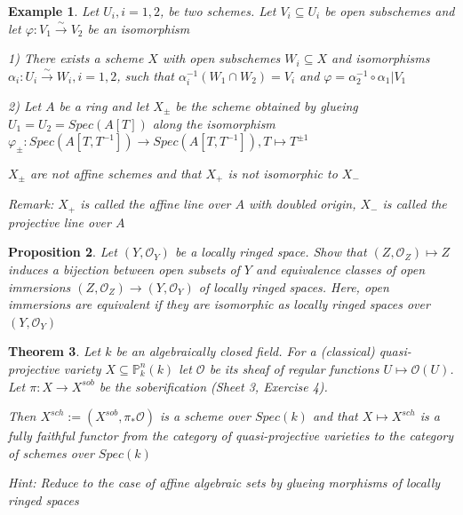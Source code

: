 \documentclass{article}
\newtheorem{theorem}{Theorem}[section]
\newtheorem{example}[theorem]{Example}
\newtheorem{proposition}[theorem]{Proposition}
\begin{document}
\begin{example}
Let $U_i, i = 1, 2$, be two schemes. Let $V_i \subseteq U_i$ be open subschemes and let $\varphi: V_1
\xrightarrow{\sim} V_2$ be an
isomorphism

1) There exists a scheme $X$ with open subschemes $W_i \subseteq X$ and isomorphisms $\alpha_i: U_i\xrightarrow{\sim}W_i, i = 1, 2$, such that $\alpha_i^{-1}(W_1 \cap W_2)= V_i$ and $\varphi = \alpha_2^{-1}\circ \alpha_1|V_1$

2) Let $A$ be a ring and let $X_{\pm}$ be the scheme obtained by glueing $U_1 = U_2 = Spec(A[T])$ along the
isomorphism $\varphi_{\pm} : Spec(A[T, T^{-1}]) \to Spec(A[T, T^{-1}]), T\mapsto T^{\pm 1}$ 

$X_\pm$ are not affine
schemes and that $X_+$ is not isomorphic to $X_-$

Remark: $X_+$ is called the affine line over $A$ with doubled origin, $X_-$ is called the projective line
over $A$
\end{example}
\begin{proposition}
Let $(Y, \mathcal O_Y )$ be a locally ringed space. Show that $(Z, \mathcal O_Z) \mapsto Z$ induces a bijection between
open subsets of $Y$ and equivalence classes of open immersions $(Z, \mathcal O_Z) \to (Y, \mathcal O_Y)$ of locally ringed
spaces. Here, open immersions are equivalent if they are isomorphic as locally ringed spaces over
$(Y, \mathcal O_Y )$
\end{proposition}
\begin{theorem}
Let $k$ be an algebraically closed field. For a (classical) quasi-projective variety $X \subseteq \mathbb P^n_k
(k)$ let
$\mathcal O$ be its sheaf of regular functions $U \mapsto \mathcal O(U)$. Let $\pi : X \to X^{sob}$ be the soberification (Sheet 3,
Exercise 4). 

Then $X^{sch} := (X^{sob}, \pi_\ast \mathcal O)$ is a scheme over $Spec(k)$ and that $X \mapsto X^{sch}$ is a
fully faithful functor from the category of quasi-projective varieties to the category of schemes over
$Spec(k)$

Hint: Reduce to the case of affine algebraic sets by glueing morphisms of locally ringed spaces
\end{theorem}



\newpage
\end{document}
